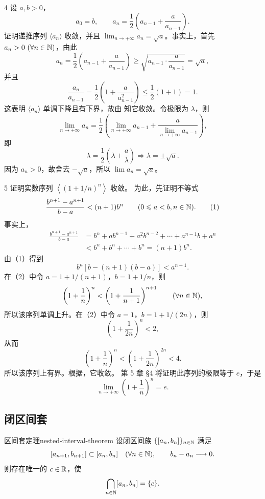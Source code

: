 \begin{sourceexample}{4}
设 \(a,b>0\)，
\[
a_0=b,\qquad a_n=\frac12\left(a_{n-1}+\frac a{a_{n-1}}\right).
\]
证明递推序列 \(\langle a_n\rangle\) 收敛，并且
\(\lim_{n\to+\infty}a_n=\sqrt a\)。事实上，首先
\(a_n>0\ (\forall n\in\mathbb{N})\)，由此
\[
a_n=\frac12\left(a_{n-1}+\frac a{a_{n-1}}\right)
\geqslant\sqrt{a_{n-1}\cdot\frac a{a_{n-1}}}=\sqrt a,
\]
并且
\[
\frac{a_n}{a_{n-1}}
=\frac12\left(1+\frac a{a_{n-1}^2}\right)
\leqslant\frac12(1+1)=1.
\]
这表明 \(\langle a_n\rangle\) 单调下降且有下界，故由
知它收敛。令极限为 \(\lambda\)，则
\[
\lim_{n\to+\infty}a_n
=\frac12\left(\lim_{n\to+\infty}a_{n-1}
+\frac a{\lim_{n\to+\infty}a_{n-1}}\right),
\]
即
\[
\lambda=\frac12\left(\lambda+\frac a\lambda\right)
\Longrightarrow\lambda=\pm\sqrt a.
\]
因为 \(a_n>0\)，故舍去 \(-\sqrt a\)，所以
\(\lim a_n=\sqrt a\)。
\end{sourceexample}

\begin{sourceexample}{5}
证明实数序列 \(\left\langle(1+1/n)^n\right\rangle\) 收敛。
为此，先证明不等式
\[
\frac{b^{n+1}-a^{n+1}}{b-a}<(n+1)b^n
\qquad(0\leqslant a<b, n\in\mathbb{N}). \tag{1}
\]
事实上，
\[
\begin{aligned}
\frac{b^{n+1}-a^{n+1}}{b-a}
&=b^n+ab^{n-1}+a^2b^{n-2}+\cdots+a^{n-1}b+a^n\\
&<b^n+b^n+\cdots+b^n=(n+1)b^n.
\end{aligned}
\]
由（1）得到
\[
b^n[b-(n+1)(b-a)]<a^{n+1}. \tag{2}
\]
在（2）中令
\(a=1+1/(n+1)\)，\(b=1+1/n\)，则
\[
\left(1+\frac1n\right)^n
<\left(1+\frac1{n+1}\right)^{n+1}\qquad(\forall n\in\mathbb{N}),
\]
所以该序列单调上升。在（2）中令 \(a=1\)，\(b=1+1/(2n)\)，则
\[
\left(1+\frac1{2n}\right)^n<2,
\]
从而
\[
\left(1+\frac1n\right)^n
<\left(1+\frac1{2n}\right)^{2n}<4.
\]
所以该序列上有界。根据，它收敛。
第 5 章 \S 4 将证明此序列的极限等于 \(e\)，于是
\[
\lim_{n\to+\infty}\left(1+\frac1n\right)^n=e.
\]
\end{sourceexample}

\subsection{闭区间套}
	\label{sec:3-4-4}

\begin{mythm}{区间套定理}{nested-interval-theorem}
设闭区间族 \(\{[a_n,b_n]\}_{n\in\mathbb{N}}\) 满足
\[
[a_{n+1},b_{n+1}]\subset[a_n,b_n]\quad(\forall n\in\mathbb{N}),
\qquad b_n-a_n\longrightarrow0.
\]
则存在唯一的 \(c\in\mathbb{R}\)，使
\[
\bigcap_{n\in\mathbb{N}}[a_n,b_n]=\{c\}.
\]
\end{mythm}

